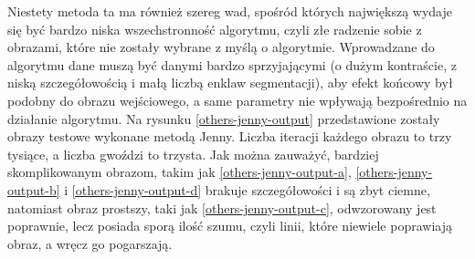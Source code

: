         Niestety metoda ta ma również szereg wad, spośród których największą wydaje się być bardzo niska wszechstronność algorytmu, czyli złe radzenie sobie z obrazami, które nie zostały wybrane z myślą o algorytmie. Wprowadzane do algorytmu dane muszą być danymi bardzo sprzyjającymi (o dużym kontraście, z niską szczegółowością i małą liczbą enklaw segmentacji), aby efekt końcowy był podobny do obrazu wejściowego, a same parametry nie wpływają bezpośrednio na działanie algorytmu. Na rysunku \ref{others-jenny-output} przedstawione zostały obrazy testowe wykonane metodą Jenny. Liczba iteracji każdego obrazu to trzy tysiące, a liczba gwoździ to trzysta. Jak można zauważyć, bardziej skomplikowanym obrazom, takim jak \ref{others-jenny-output-a}, \ref{others-jenny-output-b} i \ref{others-jenny-output-d} brakuje szczegółowości i są zbyt ciemne, natomiast obraz prostszy, taki jak \ref{others-jenny-output-c}, odwzorowany jest poprawnie, lecz posiada sporą ilość szumu, czyli linii, które niewiele poprawiają obraz, a wręcz go pogarszają.
        
